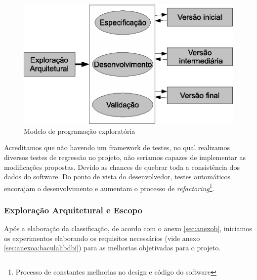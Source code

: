 \begin{figure}[h]
 \centering
 \includegraphics{../../doc/diagramas/programacao_exploratoria.eps}
 \caption[Programação exploratória]{Modelo de programação exploratória \cite{engenharia1}}
 \label{fig:exploratoria}
\end{figure}

Acreditamos que não havendo um framework de testes, no qual realizamos diversos testes de regressão no projeto, não seriamos capazes de implementar as modificações propostas. Devido as chances de quebrar toda a consistência dos dados do software. Do ponto de vista do desenvolvedor, testes automáticos encorajam o desenvolvimento e aumentam o processo de \textit{refactoring}\footnote{Processo de constantes melhorias no design e código do software}\cite[página 203]{producing}.

%  
%

\subsubsection{Exploração Arquitetural e Escopo}\label{subsec:arquiterual}\label{subsec:experiencia}

Após a elaboração da classificação, de acordo com o anexo \ref{sec:anexob}, iniciamos os experimentos elaborando os requisitos necessários (vide anexo \ref{sec:anexoa:baculalibdbi}) para as melhorias objetivadas para o projeto.

